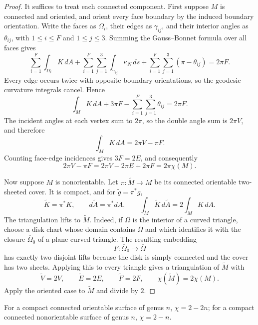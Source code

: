\begin{proof}
\sketch It suffices to treat each connected component. First suppose $M$ is
connected and oriented, and orient every face boundary by the induced boundary
orientation. Write the faces as $\Omega_i$, their edges as $\gamma_{ij}$, and
their interior angles as $\theta_{ij}$, with
$1\leq i\leq F$ and $1\leq j\leq3$. Summing the Gauss--Bonnet formula over all
faces gives
\begin{equation}
\sum_{i=1}^F\int_{\Omega_i}K\,dA
+\sum_{i=1}^F\sum_{j=1}^3\int_{\gamma_{ij}}\kappa_N\,ds
+\sum_{i=1}^F\sum_{j=1}^3(\pi-\theta_{ij})
=2\pi F. \tag{9.11}
\end{equation}
Every edge occurs twice with opposite boundary orientations, so the geodesic
curvature integrals cancel. Hence
\begin{equation}
\int_MK\,dA+3\pi F-
\sum_{i=1}^F\sum_{j=1}^3\theta_{ij}=2\pi F. \tag{9.12}
\end{equation}
The incident angles at each vertex sum to $2\pi$, so the double angle sum is
$2\pi V$, and therefore
\begin{equation}
\int_MK\,dA=2\pi V-\pi F. \tag{9.13}
\end{equation}
Counting face-edge incidences gives $3F=2E$, and consequently
\[
2\pi V-\pi F
=2\pi V-2\pi E+2\pi F
=2\pi\chi(M).
\]

Now suppose $M$ is nonorientable. Let
$\pi\colon\widetilde M\to M$ be its connected orientable two-sheeted cover.
It is compact, and for $\widetilde g=\pi^*g$,
\[
\widetilde K=\pi^*K,
\qquad d\widetilde A=\pi^*dA,
\qquad
\int_{\widetilde M}\widetilde K\,d\widetilde A
=2\int_MK\,dA.
\]
The triangulation lifts to $\widetilde M$. Indeed, if $\Omega$ is the interior
of a curved triangle, choose a disk chart whose domain contains
$\overline\Omega$ and which identifies it with the closure
$\overline\Omega_0$ of a plane curved triangle. The resulting embedding
\[
F\colon\overline\Omega_0\longrightarrow\overline\Omega
\]
has exactly two disjoint lifts because the disk is simply connected and the
cover has two sheets. Applying this to every triangle gives a triangulation of
$\widetilde M$ with
\[
\widetilde V=2V,
\qquad \widetilde E=2E,
\qquad \widetilde F=2F,
\qquad \chi(\widetilde M)=2\chi(M).
\]
Apply the oriented case to $\widetilde M$ and divide by $2$.
\end{proof}

For a compact connected orientable surface of genus $n$,
$\chi=2-2n$; for a compact connected nonorientable surface of genus $n$,
$\chi=2-n$.

